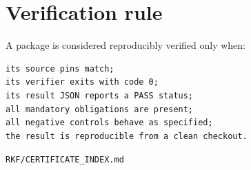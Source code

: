 \hypertarget{verification-rule}{%
\section{Verification rule}\label{verification-rule}}

A package is considered reproducibly verified only when:

\begin{verbatim}
its source pins match;
its verifier exits with code 0;
its result JSON reports a PASS status;
all mandatory obligations are present;
all negative controls behave as specified;
the result is reproducible from a clean checkout.
\end{verbatim}

\begin{flushright}\small\texttt{RKF/CERTIFICATE\_INDEX.md}\end{flushright}
